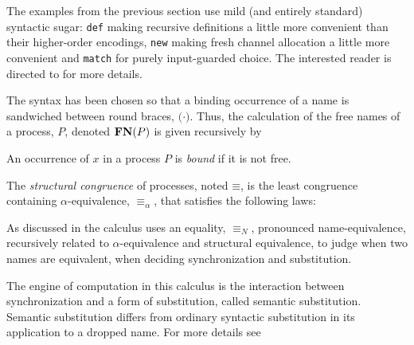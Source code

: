 \documentclass[submission,copyright,creativecommons]{eptcs}
\newcommand{\id}[1]{\texttt{#1}}
\newcommand{\pzero}{\mathbin{0}}
\newcommand{\juxtap}{\mathbin{\id{|}}}
\newcommand{\scong}{\mathbin{\equiv}}
\newcommand{\nameeq}{\mathbin{\equiv_N}}
\newcommand{\alphaeq}{\mathbin{\equiv_{\alpha}}}
\newcommand{\freenames}[1]{\mathbin{\bold{FN}(#1)}}
\newcommand{\binpar}[2]{#1 \juxtap #2}
\newcommand{\defneqls}{\coloneqq}
\numberwithin{equation}{subsection}
\begin{document}
The examples from the previous section use mild (and entirely
standard) syntactic sugar: \texttt{def} making recursive definitions a
little more convenient than their higher-order encodings, \texttt{new}
making fresh channel allocation a little more convenient and
\texttt{match} for purely input-guarded choice. The interested
reader is directed to \cite{DBLP:Journals/Corr/MeredithSD13} for more details.

The syntax has been chosen so that a binding occurrence of a name is
sandwiched between round braces, ${(} \cdot {)}$. Thus, the
calculation of the free names of a process, $P$, denoted
$\freenames{P}$ is given recursively by


An occurrence of $x$ in a process $P$ is \textit{bound} if it is not
free. 

The {\em structural congruence} of processes, noted $\scong$, is the
least congruence containing $\alpha$-equivalence, $\alphaeq$, that
satisfies the following laws:


As discussed in \cite{DBLP:conf/tgc/MeredithR05} the calculus uses an
equality, $\nameeq$, pronounced name-equivalence, recursively related
to $\alpha$-equivalence and structural equivalence, to judge when two
names are equivalent, when deciding synchronization and substitution.

The engine of computation in this calculus is the interaction between
synchronization and a form of substitution, called semantic
substitution. Semantic substitution differs from ordinary syntactic
substitution in its application to a dropped name. For more details
see \cite{DBLP:journals/entcs/MeredithR05}
\end{document}
